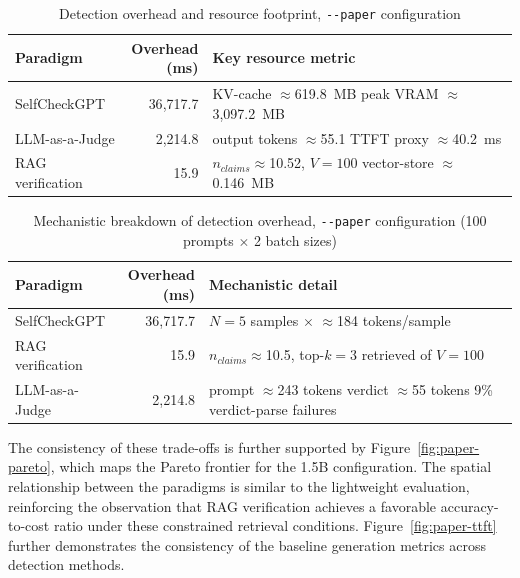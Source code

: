 \documentclass[conference]{IEEEtran}
\begin{document}
\begin{table}[!htbp]
\caption{Detection overhead and resource footprint, \texttt{-{}-paper} configuration}
\label{tab:paper-overhead}
\centering
\small
\begin{tabular}{@{}lrl@{}}
\toprule
Paradigm & \makecell[r]{Overhead\\(ms)} & Key resource metric \\
\midrule
SelfCheckGPT &
  36{,}717.7 &
  \makecell[l]{KV-cache $\approx$619.8~MB \\ peak VRAM $\approx$3{,}097.2~MB} \\[2pt]
LLM-as-a-Judge &
  2{,}214.8 &
  \makecell[l]{output tokens $\approx$55.1 \\ TTFT proxy $\approx$40.2~ms} \\[2pt]
RAG verification &
  15.9 &
  \makecell[l]{$n_{claims}\approx$10.52, $V{=}100$ \\ vector-store $\approx$0.146~MB} \\
\bottomrule
\end{tabular}
\end{table}

\begin{table}[!htbp]
\caption{Mechanistic breakdown of detection overhead, \texttt{-{}-paper} configuration (100 prompts $\times$ 2 batch sizes)}
\label{tab:paper-mechanistic}
\centering
\small
\begin{tabular}{@{}lrl@{}}
\toprule
Paradigm & \makecell[r]{Overhead\\(ms)} & Mechanistic detail \\
\midrule
SelfCheckGPT &
  36{,}717.7 &
  \makecell[l]{$N{=}5$ samples $\times$ \\ $\approx$184 tokens/sample} \\[4pt]
RAG verification &
  15.9 &
  \makecell[l]{$n_{claims}\approx$10.5, top-$k{=}3$ \\ retrieved of $V{=}100$} \\[4pt]
LLM-as-a-Judge &
  2{,}214.8 &
  \makecell[l]{prompt $\approx$243 tokens \\ verdict $\approx$55 tokens \\ 9\% verdict-parse failures} \\
\bottomrule
\end{tabular}
\end{table}

The consistency of these trade-offs is further supported by Figure~\ref{fig:paper-pareto}, which maps the Pareto frontier for the 1.5B configuration. The spatial relationship between the paradigms is similar to the lightweight evaluation, reinforcing the observation that RAG verification achieves a favorable accuracy-to-cost ratio under these constrained retrieval conditions. Figure~\ref{fig:paper-ttft} further demonstrates the consistency of the baseline generation metrics across detection methods. 
\end{document}

